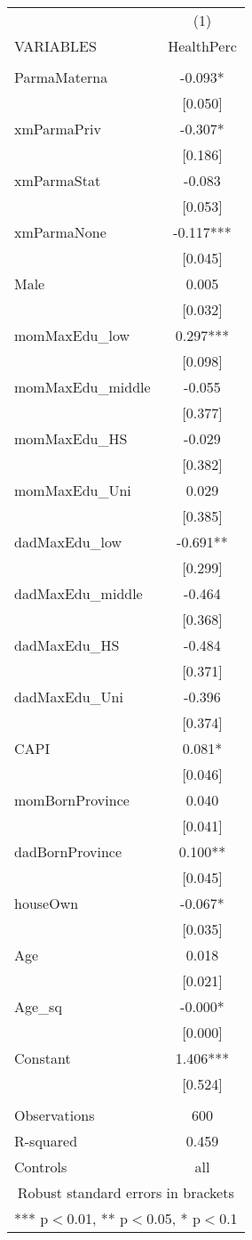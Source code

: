 \documentclass[]{article}
\begin{document}
\begin{tabular}{lc} \hline
 & (1) \\
VARIABLES & HealthPerc \\ \hline
 &  \\
ParmaMaterna & -0.093* \\
 & [0.050] \\
xmParmaPriv & -0.307* \\
 & [0.186] \\
xmParmaStat & -0.083 \\
 & [0.053] \\
xmParmaNone & -0.117*** \\
 & [0.045] \\
Male & 0.005 \\
 & [0.032] \\
momMaxEdu\_low & 0.297*** \\
 & [0.098] \\
momMaxEdu\_middle & -0.055 \\
 & [0.377] \\
momMaxEdu\_HS & -0.029 \\
 & [0.382] \\
momMaxEdu\_Uni & 0.029 \\
 & [0.385] \\
dadMaxEdu\_low & -0.691** \\
 & [0.299] \\
dadMaxEdu\_middle & -0.464 \\
 & [0.368] \\
dadMaxEdu\_HS & -0.484 \\
 & [0.371] \\
dadMaxEdu\_Uni & -0.396 \\
 & [0.374] \\
CAPI & 0.081* \\
 & [0.046] \\
momBornProvince & 0.040 \\
 & [0.041] \\
dadBornProvince & 0.100** \\
 & [0.045] \\
houseOwn & -0.067* \\
 & [0.035] \\
Age & 0.018 \\
 & [0.021] \\
Age\_sq & -0.000* \\
 & [0.000] \\
Constant & 1.406*** \\
 & [0.524] \\
 &  \\
Observations & 600 \\
R-squared & 0.459 \\
 Controls & all \\ \hline
\multicolumn{2}{c}{ Robust standard errors in brackets} \\
\multicolumn{2}{c}{ *** p$<$0.01, ** p$<$0.05, * p$<$0.1} \\
\end{tabular}
\end{document}
